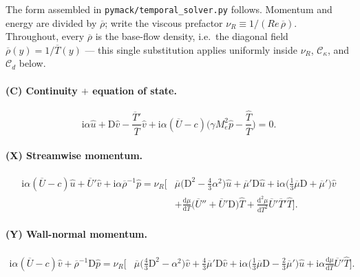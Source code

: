 \documentclass[11pt]{article}
\newcommand{\D}{\mathrm{D}}
\newcommand{\imag}{\mathrm{i}}
\newcommand{\Mae}{M_e}
\newcommand{\Ree}{\mathit{Re}}
\renewcommand{\bar}[1]{\overline{#1}}
\newcommand{\hatu}{\hat{u}}
\newcommand{\hatv}{\hat{v}}
\newcommand{\hatT}{\hat{T}}
\newcommand{\hatp}{\hat{p}}
\newcommand{\nuR}{\nu_{\!R}}
\begin{document}
The form assembled in \texttt{pymack/temporal\_solver.py} follows. Momentum and energy are divided by
$\bar\rho$; write the viscous prefactor $\nuR\equiv1/(\Ree\,\bar\rho)$. Throughout, every $\bar\rho$ is the
base-flow density, i.e.\ the diagonal field $\bar\rho(y)=1/\bar T(y)$ --- this single substitution applies
uniformly inside $\nuR$, $\mathcal C_\kappa$, and $\mathcal C_d$ below.

\paragraph{(C) Continuity $+$ equation of state.}
\begin{equation}\label{eq:cont}
  \imag\alpha\hatu+\D\hatv-\frac{\bar T'}{\bar T}\hatv
  +\imag\alpha(\bar U-c)\Big(\gamma\Mae^2\hatp-\frac{\hatT}{\bar T}\Big)=0 .
\end{equation}

\paragraph{(X) Streamwise momentum.}
\begin{equation}\label{eq:xmom}
\begin{aligned}
  \imag\alpha(\bar U-c)\hatu+\bar U'\hatv+\imag\alpha\bar\rho^{-1}\hatp
  =\nuR\Big[&\bar\mu\big(\D^2-\tfrac43\alpha^2\big)\hatu+\bar\mu'\D\hatu
     +\imag\alpha\big(\tfrac13\bar\mu\D+\bar\mu'\big)\hatv\\
   &+\tfrac{\mathrm d\mu}{\mathrm dT}\big(\bar U''+\bar U'\D\big)\hatT
     +\tfrac{\mathrm d^2\mu}{\mathrm dT^2}\bar U'\bar T'\hatT\Big] .
\end{aligned}
\end{equation}

\paragraph{(Y) Wall-normal momentum.}
\begin{equation}\label{eq:ymom}
\begin{aligned}
  \imag\alpha(\bar U-c)\hatv+\bar\rho^{-1}\D\hatp
  =\nuR\Big[&\bar\mu\big(\tfrac43\D^2-\alpha^2\big)\hatv+\tfrac43\bar\mu'\D\hatv
   +\imag\alpha\big(\tfrac13\bar\mu\D-\tfrac23\bar\mu'\big)\hatu
   +\imag\alpha\tfrac{\mathrm d\mu}{\mathrm dT}\bar U'\hatT\Big] .
\end{aligned}
\end{equation}
\end{document}
